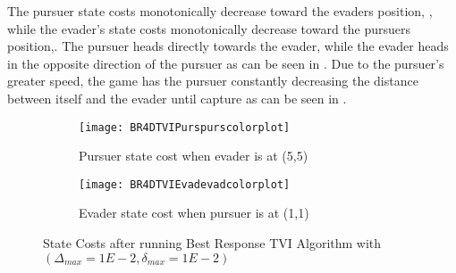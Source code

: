 The pursuer state costs monotonically decrease toward the evaders position, , while the evader's state costs monotonically decrease toward the pursuers position,. The pursuer heads directly towards the evader, while the evader heads in the opposite direction of the pursuer as can be seen in . Due to the pursuer's greater speed, the game has the pursuer constantly decreasing the distance between itself and the evader until capture as can be seen in .
\begin{figure}[h!]
\centering
\begin{subfigure}[t]{0.475\textwidth}
	\centering
	\texttt{[image: BR4DTVIPurspurscolorplot]}
	\caption{Pursuer state cost when evader is at (5,5)}
	\label{BR4DTVIPcp}
\end{subfigure}
\hfill
\begin{subfigure}[t]{0.475\textwidth}
	\centering
	\texttt{[image: BR4DTVIEvadevadcolorplot]}
	\caption{Evader state cost when pursuer is at (1,1)}
	\label{BR4DTVIEcp}
\end{subfigure}
\caption{State Costs after running Best Response TVI Algorithm with $(\Delta_{max} = 1E-2,\delta_{max} = 1E-2)$}
\label{BR4DTVIcp}
\end{figure}
